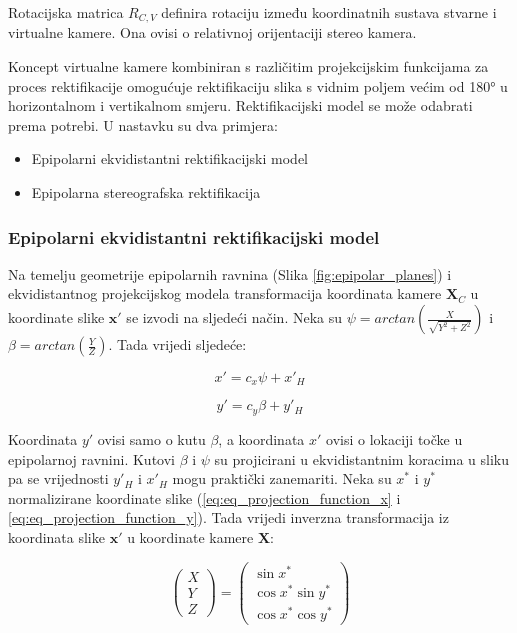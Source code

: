\documentclass[../seminar.tex]{subfiles}
\begin{document}
Rotacijska matrica $R_{C,V}$ definira rotaciju između koordinatnih sustava stvarne i virtualne kamere. Ona ovisi o relativnoj orijentaciji stereo kamera.

Koncept virtualne kamere kombiniran s različitim projekcijskim funkcijama za proces rektifikacije omogućuje rektifikaciju slika s vidnim poljem većim od 180° u horizontalnom i vertikalnom smjeru.
Rektifikacijski model se može odabrati prema potrebi. U nastavku su dva primjera:
\begin{itemize}
\setlength\itemsep{2em}
\item Epipolarni ekvidistantni rektifikacijski model
\item Epipolarna stereografska rektifikacija
\end{itemize}

\subsubsection{Epipolarni ekvidistantni rektifikacijski model}

Na temelju geometrije epipolarnih ravnina (Slika \ref{fig:epipolar_planes}) i ekvidistantnog projekcijskog modela transformacija koordinata kamere $\boldsymbol{X}_C$ 
u koordinate slike $\boldsymbol{x'}$ se izvodi na sljedeći način. Neka su $\psi = arctan(\frac{X}{\sqrt{Y^2 + Z^2}})$ i $\beta = arctan(\frac{Y}{Z})$.
Tada vrijedi sljedeće:

\begin{equation}
\label{eq:eq_transformation_equidistance_x}
x' = c_x\psi + x'_H
\end{equation}

\begin{equation}
\label{eq:eq_transformation_equidistance_y}
y' = c_y\beta + y'_H
\end{equation}

Koordinata $y'$ ovisi samo o kutu $\beta$, a koordinata $x'$ ovisi o lokaciji točke u epipolarnoj ravnini. Kutovi $\beta$ i $\psi$ su projicirani u ekvidistantnim koracima u sliku pa se vrijednosti $y'_H$ i $x'_H$ mogu praktički zanemariti.
Neka su $x^*$ i $y^*$ normalizirane koordinate slike (\ref{eq:eq_projection_function_x} i \ref{eq:eq_projection_function_y}). 
Tada vrijedi inverzna transformacija iz koordinata slike $\boldsymbol{x'}$ u koordinate kamere $\boldsymbol{X}$:

\begin{equation}
\label{eq:eq_transformation_camera}
\begin{pmatrix} X \\ Y \\ Z \end{pmatrix} = \begin{pmatrix} \sin x^* \\ \cos x^* \sin y^* \\ \cos x^* \cos y^* \end{pmatrix}
\end{equation}
\end{document}
